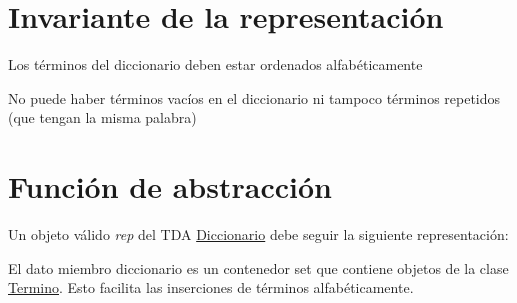 \hypertarget{repDiccionario_invDiccionario}{}\section{Invariante de la representación}\label{repDiccionario_invDiccionario}

\begin{DoxyItemize}
\item Los términos del diccionario deben estar ordenados alfabéticamente
\item No puede haber términos vacíos en el diccionario ni tampoco términos repetidos (que tengan la misma palabra) 
\end{DoxyItemize}\hypertarget{repDiccionario_faDiccionario}{}\section{Función de abstracción}\label{repDiccionario_faDiccionario}
Un objeto válido {\itshape rep} del T\+DA \hyperlink{classDiccionario}{Diccionario} debe seguir la siguiente representación\+:
\begin{DoxyItemize}
\item El dato miembro diccionario es un contenedor set que contiene objetos de la clase \hyperlink{classTermino}{Termino}. Esto facilita las inserciones de términos alfabéticamente. 
\end{DoxyItemize}